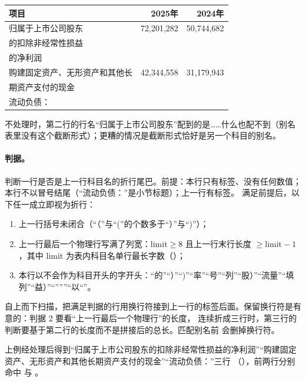 \begin{center}
\scriptsize
\begin{tabular}{|l|r|r|}
\hline
项目 & 2025年 & 2024年 \\ \hline
归属于上市公司股东 & 72,201,282 & 50,744,682 \\ \hline
的扣除非经常性损益 & & \\ \hline
的净利润 & & \\ \hline
购建固定资产、无形资产和其他长 & 42,344,558 & 31,179,943 \\ \hline
期资产支付的现金 & & \\ \hline
流动负债： & & \\ \hline
\end{tabular}
\end{center}

不处理时，第二行的行名“归属于上市公司股东”配到的是……什么也配不到（别名表里没有这个截断形式）；更糟的情况是截断形式恰好是另一个科目的别名。

\paragraph{判据。}
 判断一行是否是上一行科目名的折行尾巴。前提：本行只有标签、没有任何数值；本行不以冒号结尾（“流动负债：”是小节标题）；上一行有标签。
满足前提后，以下任一成立即视为折行：
\begin{enumerate}
\item 上一行括号未闭合（“（”与“(”的个数多于“）”与“)”）；
\item 上一行最后一个物理行写满了列宽：$\text{limit}\ge 8$ 且上一行末行长度 $\ge \text{limit}-1$，其中 limit 为表内科目名单行最长字数（）；
\item 本行以不会作为科目开头的字开头：“的”“）”“)”“率”“号”“列”“股）”“流量”“填列”“益）”“”””“以“”。
\end{enumerate}
 自上而下扫描，把满足判据的行用换行符接到上一行的标签后面。保留换行符是有意的：判据 2 要看“上一行最后一个物理行”的长度，
连续折成三行时，第三行的判断要基于第二行的长度而不是拼接后的总长。匹配别名前  会删掉换行符。

上例经处理后得到“归属于上市公司股东的扣除非经常性损益的净利润”“购建固定资产、无形资产和其他长期资产支付的现金”“流动负债：”三行
（），前两行分别命中  与 。

